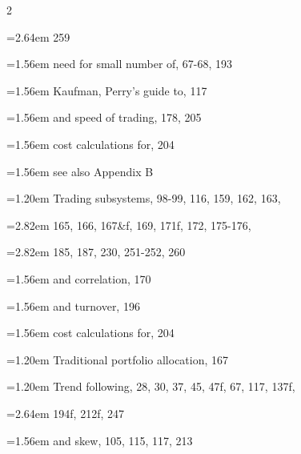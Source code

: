 {\begin{multicols}{2}
\par \noindent\hangindent=2.64em\hspace*{1.44em} 259
\par \noindent\hangindent=1.56em\hspace*{0.36em} need for small number of, 67-68, 193
\par \noindent\hangindent=1.56em\hspace*{0.36em} Kaufman, Perry’s guide to, 117
\par \noindent\hangindent=1.56em\hspace*{0.36em} and speed of trading, 178, 205
\par \noindent\hangindent=1.56em\hspace*{0.36em} cost calculations for, 204
\par \noindent\hangindent=1.56em\hspace*{0.36em} see also Appendix B
\par \noindent\hangindent=1.20em\hspace*{0.00em} Trading subsystems, 98-99, 116, 159, 162, 163,
\par \noindent\hangindent=2.82em\hspace*{1.62em} 165, 166, 167\&f, 169, 171f, 172, 175-176,
\par \noindent\hangindent=2.82em\hspace*{1.62em} 185, 187, 230, 251-252, 260
\par \noindent\hangindent=1.56em\hspace*{0.36em} and correlation, 170
\par \noindent\hangindent=1.56em\hspace*{0.36em} and turnover, 196
\par \noindent\hangindent=1.56em\hspace*{0.36em} cost calculations for, 204
\par \noindent\hangindent=1.20em\hspace*{0.00em} Traditional portfolio allocation, 167
\par \noindent\hangindent=1.20em\hspace*{0.00em} Trend following, 28, 30, 37, 45, 47f, 67, 117, 137f,
\par \noindent\hangindent=2.64em\hspace*{1.44em} 194f, 212f, 247
\par \noindent\hangindent=1.56em\hspace*{0.36em} and skew, 105, 115, 117, 213

\end{multicols}}
